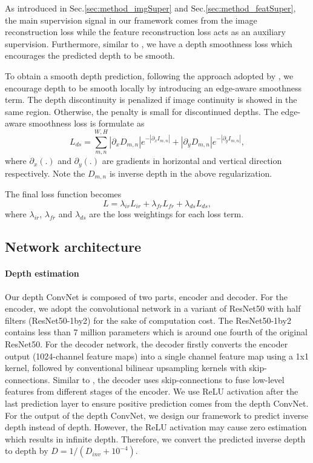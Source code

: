 \documentclass[10pt,twocolumn,letterpaper]{article}
\begin{document}
As introduced in Sec.\ref{sec:method_imgSuper} and Sec.\ref{sec:method_featSuper}, the main supervision signal in our framework comes from the image reconstruction loss while the feature reconstruction loss acts as an auxiliary supervision. Furthermore, similar to \cite{garg2016depth}\cite{zhou2017sfmlearner}\cite{godard2016depth}, we have a depth smoothness loss which encourages the predicted depth to be smooth.

To obtain a smooth depth prediction, following the approach adopted by \cite{heise2013pm}\cite{godard2016depth}, we encourage depth to be smooth locally by introducing an edge-aware smoothness term. The depth discontinuity is penalized if image continuity is showed in the same region. Otherwise, the penalty is small for discontinued depths.
The edge-aware smoothness loss is formulate as
\begin{equation}
    L_{ds} = \sum_{m,n}^{W,H}
    |\partial_x D_{m,n}| e^{-|{\partial_x I_{m,n}}|}+
    |\partial_y D_{m,n}| e^{-|{\partial_y I_{m,n}}|},
\end{equation}
where $\partial_x(.)$ and $\partial_y(.)$ are gradients in horizontal and vertical direction respectively. Note the $D_{m,n}$ is inverse depth in the above regularization.

The final loss function becomes 
\begin{equation}
    L =
    \lambda_{ir} L_{ir} + 
    \lambda_{fr} L_{fr} +
    \lambda_{ds} L_{ds},
\end{equation}
where $\lambda_{ir}$, $\lambda_{fr}$ and $\lambda_{ds}$ are the loss weightings for each loss term.


\subsection{Network architecture} \label{sec:method_netArchi}
\paragraph{Depth estimation}

Our depth ConvNet is composed of two parts, encoder and decoder. 
For the encoder, we adopt the convolutional network in a variant of ResNet50 \cite{he2016resnet} with half filters (ResNet50-1by2)  for the sake of computation cost. The ResNet50-1by2 contains less than 7 million parameters which is around one fourth of the original ResNet50. For the decoder network, the decoder firstly converts the encoder output (1024-channel feature maps) into a single channel feature map using a 1x1 kernel, followed by conventional bilinear upsampling kernels with skip-connections.
Similar to \cite{long2015fcn}\cite{garg2016depth}\cite{godard2016depth}, the decoder uses skip-connections to fuse low-level features from different stages of the encoder. 
We use ReLU activation after the last prediction layer to ensure positive prediction comes from the depth ConvNet. For the output of the depth ConvNet, we design our framework to predict inverse depth instead of depth. However, the ReLU activation may cause zero estimation which results in infinite depth. Therefore, we convert the predicted inverse depth to depth by $D = 1/(D_{inv}+10^{-4})$.
\end{document}
